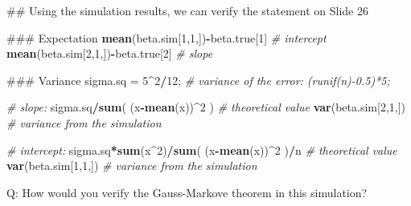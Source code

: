 \documentclass[12pt,]{book}
\newenvironment{Shaded}{\begin{snugshade}}{\end{snugshade}}
\newcommand{\KeywordTok}[1]{\textcolor[rgb]{0.13,0.29,0.53}{\textbf{#1}}}
\newcommand{\DecValTok}[1]{\textcolor[rgb]{0.00,0.00,0.81}{#1}}
\newcommand{\StringTok}[1]{\textcolor[rgb]{0.31,0.60,0.02}{#1}}
\newcommand{\CommentTok}[1]{\textcolor[rgb]{0.56,0.35,0.01}{\textit{#1}}}
\newcommand{\OperatorTok}[1]{\textcolor[rgb]{0.81,0.36,0.00}{\textbf{#1}}}
\newcommand{\NormalTok}[1]{#1}
\begin{document}
\begin{Shaded}
\begin{Highlighting}[]
\NormalTok{## Using the simulation results, we can verify the statement on Slide 26}

\NormalTok{### Expectation }
\KeywordTok{mean}\NormalTok{(beta.sim[}\DecValTok{1}\NormalTok{,}\DecValTok{1}\NormalTok{,])}\OperatorTok{-}\NormalTok{beta.true[}\DecValTok{1}\NormalTok{] }\CommentTok{# intercept }
\KeywordTok{mean}\NormalTok{(beta.sim[}\DecValTok{2}\NormalTok{,}\DecValTok{1}\NormalTok{,])}\OperatorTok{-}\NormalTok{beta.true[}\DecValTok{2}\NormalTok{] }\CommentTok{# slope }

\NormalTok{### Variance }
\NormalTok{sigma.sq =}\StringTok{ }\DecValTok{5}\OperatorTok{^}\DecValTok{2}\OperatorTok{/}\DecValTok{12}\NormalTok{; }\CommentTok{# variance of the error: (runif(n)-0.5)*5;}

\CommentTok{# slope:}
\NormalTok{sigma.sq}\OperatorTok{/}\KeywordTok{sum}\NormalTok{(  (x}\OperatorTok{-}\KeywordTok{mean}\NormalTok{(x))}\OperatorTok{^}\DecValTok{2}\NormalTok{  ) }\CommentTok{# theoretical value }
\KeywordTok{var}\NormalTok{(beta.sim[}\DecValTok{2}\NormalTok{,}\DecValTok{1}\NormalTok{,]) }\CommentTok{# variance from the simulation }


\CommentTok{# intercept:}
\NormalTok{sigma.sq}\OperatorTok{*}\KeywordTok{sum}\NormalTok{(x}\OperatorTok{^}\DecValTok{2}\NormalTok{)}\OperatorTok{/}\KeywordTok{sum}\NormalTok{(  (x}\OperatorTok{-}\KeywordTok{mean}\NormalTok{(x))}\OperatorTok{^}\DecValTok{2}\NormalTok{  )}\OperatorTok{/}\NormalTok{n }\CommentTok{# theoretical value }
\KeywordTok{var}\NormalTok{(beta.sim[}\DecValTok{1}\NormalTok{,}\DecValTok{1}\NormalTok{,]) }\CommentTok{# variance from the simulation }
\end{Highlighting}
\end{Shaded}

Q: How would you verify the Gauss-Markove theorem in this simulation?
\end{document}
